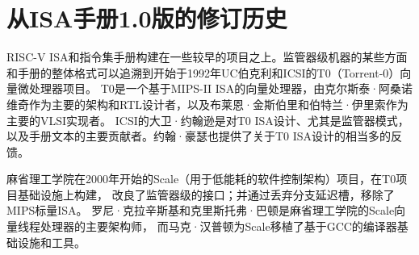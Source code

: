 \section{从ISA手册1.0版的修订历史}

RISC-V ISA和指令集手册构建在一些较早的项目之上。监管器级机器的某些方面和手册的整体格式可以追溯到开始于1992年UC伯克利和ICSI的T0（Torrent-0）向量微处理器项目。
T0是一个基于MIPS-II ISA的向量处理器，由克尔斯泰·阿桑诺维奇作为主要的架构和RTL设计者，以及布莱恩·金斯伯里和伯特兰·伊里索作为主要的VLSI实现者。
ICSI的大卫·约翰逊是对T0 ISA设计、尤其是监管器模式，以及手册文本的主要贡献者。约翰·豪瑟也提供了关于T0 ISA设计的相当多的反馈。

麻省理工学院在2000年开始的Scale（用于低能耗的软件控制架构）项目，在T0项目基础设施上构建，
改良了监管器级的接口；并通过丢弃分支延迟槽，移除了MIPS标量ISA。
罗尼·克拉辛斯基和克里斯托弗·巴顿是麻省理工学院的Scale向量线程处理器的主要架构师，
而马克·汉普顿为Scale移植了基于GCC的编译器基础设施和工具。

